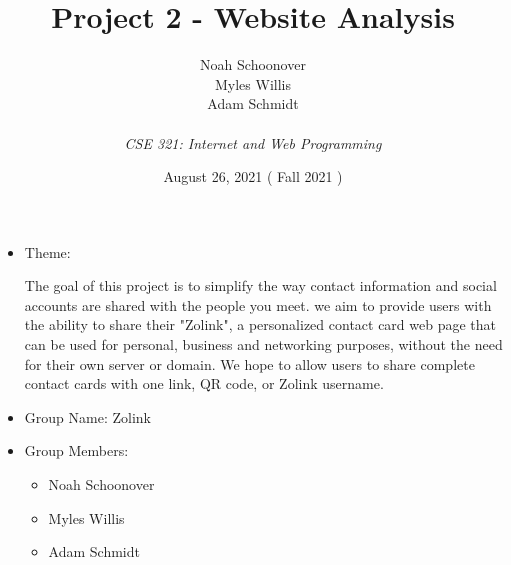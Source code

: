 \documentclass[12pt]{article}%
\def\assignmentName { Project 2 - Website Analysis                      }
\def\className      { CSE 321: Internet and Web Programming             }
\def\studentName    { Noah Schoonover \\ Myles Willis \\ Adam Schmidt   }
\def\studentEmail   {  }
\def\dueDate        { August 26, 2021                                   }
\def\semesterDate   { Fall 2021                                         }
\begin{document}


\begin{singlespace}
\title{ \assignmentName }
\author{ \studentName \\ {\small \studentEmail} \\ {\it \className}}
\date{\dueDate (\semesterDate)}
\maketitle
\end{singlespace}



\begin{itemize}
    \item Theme:

    The goal of this project is to simplify the way contact information and social accounts are shared with the people you meet.
    we aim to provide users with the ability to share their "Zolink", a personalized contact card web page that can be used for personal,
    business and networking purposes, without the need for their own server or domain. We hope to allow users to share complete
    contact cards with one link, QR code, or Zolink username.

    \item Group Name: Zolink
    \item Group Members:
    \begin{itemize}
    	\item Noah Schoonover
    	\item Myles Willis
    	\item Adam Schmidt
    \end{itemize}
\end{itemize}
\end{document}
